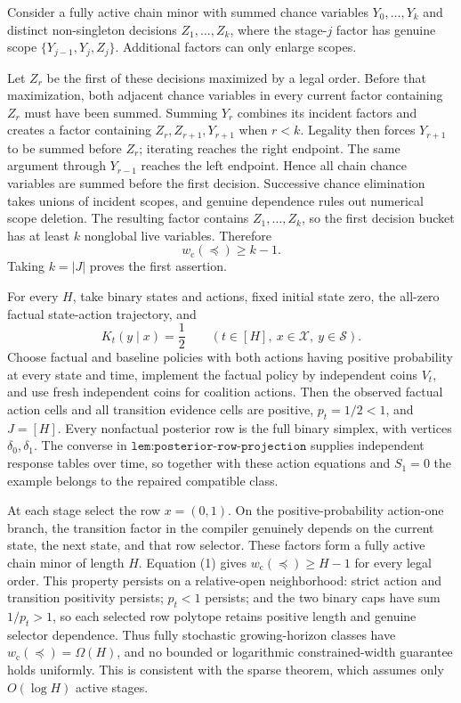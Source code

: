 Consider a fully active chain minor with summed chance variables \(Y_0,\ldots,Y_k\) and distinct non-singleton decisions \(Z_1,\ldots,Z_k\), where the stage-\(j\) factor has genuine scope \(\{Y_{j-1},Y_j,Z_j\}\).  Additional factors can only enlarge scopes.

Let \(Z_r\) be the first of these decisions maximized by a legal order.  Before that maximization, both adjacent chance variables in every current factor containing \(Z_r\) must have been summed.  Summing \(Y_r\) combines its incident factors and creates a factor containing \(Z_r,Z_{r+1},Y_{r+1}\) when \(r<k\).  Legality then forces \(Y_{r+1}\) to be summed before \(Z_r\); iterating reaches the right endpoint.  The same argument through \(Y_{r-1}\) reaches the left endpoint.  Hence all chain chance variables are summed before the first decision.  Successive chance elimination takes unions of incident scopes, and genuine dependence rules out numerical scope deletion.  The resulting factor contains \(Z_1,\ldots,Z_k\), so the first decision bucket has at least \(k\) nonglobal live variables.  Therefore
\[
 w_{\mathrm c}(\preceq)\ge k-1. \tag{1}
\]
Taking \(k=|J|\) proves the first assertion.

For every \(H\), take binary states and actions, fixed initial state zero, the all-zero factual state-action trajectory, and
\[
 K_t(y\mid x)=\frac12
 \qquad(t\in[H],\ x\in\mathcal X,\ y\in\mathcal S). \tag{2}
\]
Choose factual and baseline policies with both actions having positive probability at every state and time, implement the factual policy by independent coins \(V_t\), and use fresh independent coins for coalition actions.  Then the observed factual action cells and all transition evidence cells are positive, \(p_t=1/2<1\), and \(J=[H]\).  Every nonfactual posterior row is the full binary simplex, with vertices \(\delta_0,\delta_1\).  The converse in \(\texttt{lem:posterior-row-projection}\) supplies independent response tables over time, so together with these action equations and \(S_1=0\) the example belongs to the repaired compatible class.

At each stage select the row \(x=(0,1)\).  On the positive-probability action-one branch, the transition factor in the compiler genuinely depends on the current state, the next state, and that row selector.  These factors form a fully active chain minor of length \(H\).  Equation (1) gives \(w_{\mathrm c}(\preceq)\ge H-1\) for every legal order.  This property persists on a relative-open neighborhood: strict action and transition positivity persists; \(p_t<1\) persists; and the two binary caps have sum \(1/p_t>1\), so each selected row polytope retains positive length and genuine selector dependence.  Thus fully stochastic growing-horizon classes have \(w_{\mathrm c}(\preceq)=\Omega(H)\), and no bounded or logarithmic constrained-width guarantee holds uniformly.  This is consistent with the sparse theorem, which assumes only \(O(\log H)\) active stages.